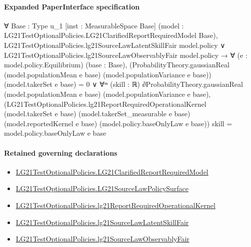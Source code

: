 \documentclass[10pt]{article}
\begin{document}
\paragraph{Expanded PaperInterface specification}
\begin{ReviewVerbatim}
∀ {Base : Type u_1} [inst : MeasurableSpace Base]
  (model : LG21TestOptionalPolicies.LG21ClarifiedReportRequiredModel Base),
  LG21TestOptionalPolicies.lg21SourceLawLatentSkillFair model.policy ∨
      LG21TestOptionalPolicies.lg21SourceLawObservablyFair model.policy →
    ∀ (e : model.policy.Equilibrium) (base : Base),
      (ProbabilityTheory.gaussianReal (model.populationMean e base) (model.populationVariance e base))
            (model.takerSet e base) =
          0 ∨
        ∀ᵐ (skill : ℝ) ∂ProbabilityTheory.gaussianReal (model.populationMean e base) (model.populationVariance e base),
          (LG21TestOptionalPolicies.lg21ReportRequiredOperationalKernel (model.takerSet e base)
                (model.takerSet_measurable e base) (model.reportedKernel e base) (model.policy.baseOnlyLaw e base))
              skill =
            model.policy.baseOnlyLaw e base
\end{ReviewVerbatim}

\paragraph{Retained governing declarations}
\begin{itemize}\raggedright
\item \hyperlink{governing-declaration-7724598115a85bb3}{LG21\allowbreak{}Test\allowbreak{}Optional\allowbreak{}Policies.\allowbreak{}LG21\allowbreak{}Clarified\allowbreak{}Report\allowbreak{}Required\allowbreak{}Model}
\item \hyperlink{governing-declaration-48965123e52b8b0f}{LG21\allowbreak{}Test\allowbreak{}Optional\allowbreak{}Policies.\allowbreak{}LG21\allowbreak{}Source\allowbreak{}Law\allowbreak{}Policy\allowbreak{}Surface}
\item \hyperlink{governing-declaration-2d3337b005590c6c}{LG21\allowbreak{}Test\allowbreak{}Optional\allowbreak{}Policies.\allowbreak{}lg21\allowbreak{}Report\allowbreak{}Required\allowbreak{}Operational\allowbreak{}Kernel}
\item \hyperlink{paper-prerequisite-29470906bfc1caef}{LG21\allowbreak{}Test\allowbreak{}Optional\allowbreak{}Policies.\allowbreak{}lg21\allowbreak{}Source\allowbreak{}Law\allowbreak{}Latent\allowbreak{}Skill\allowbreak{}Fair}
\item \hyperlink{paper-prerequisite-a01f7afb43c09d7e}{LG21\allowbreak{}Test\allowbreak{}Optional\allowbreak{}Policies.\allowbreak{}lg21\allowbreak{}Source\allowbreak{}Law\allowbreak{}Observably\allowbreak{}Fair}
\end{itemize}
\end{document}
